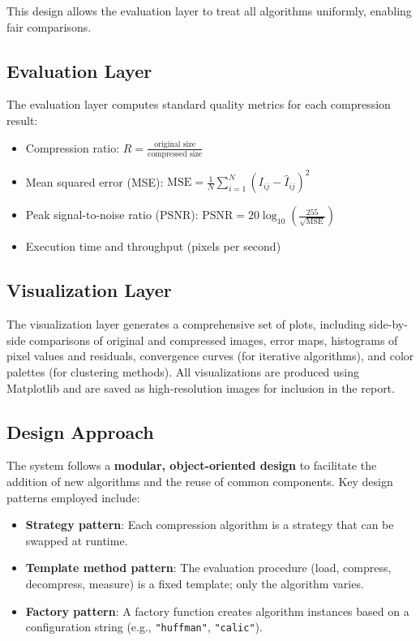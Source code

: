 This design allows the evaluation layer to treat all algorithms uniformly, enabling fair comparisons.

\subsection{Evaluation Layer}

The evaluation layer computes standard quality metrics for each compression result:

\begin{itemize}
    \item Compression ratio: \( \displaystyle R = \frac{\text{original size}}{\text{compressed size}} \)
    
    \item Mean squared error (MSE): \( \displaystyle \text{MSE} = \frac{1}{N}\sum_{i=1}^{N} (I_{ij} - \hat{I}_{ij})^2 \)
    
    \item Peak signal-to-noise ratio (PSNR): \( \displaystyle \text{PSNR} = 20\log_{10}\left(\frac{255}{\sqrt{\text{MSE}}}\right) \)
    
    \item Execution time and throughput (pixels per second)
\end{itemize}

\subsection{Visualization Layer}

The visualization layer generates a comprehensive set of plots, including side-by-side comparisons of original and compressed images, error maps, histograms of pixel values and residuals, convergence curves (for iterative algorithms), and color palettes (for clustering methods). All visualizations are produced using Matplotlib and are saved as high-resolution images for inclusion in the report.

\subsection{Design Approach}

The system follows a \textbf{modular, object-oriented design} to facilitate the addition of new algorithms and the reuse of common components. Key design patterns employed include:

\begin{itemize}
    \item \textbf{Strategy pattern}: Each compression algorithm is a strategy that can be swapped at runtime.
    \item \textbf{Template method pattern}: The evaluation procedure (load, compress, decompress, measure) is a fixed template; only the algorithm varies.
    \item \textbf{Factory pattern}: A factory function creates algorithm instances based on a configuration string (e.g., \texttt{"huffman"}, \texttt{"calic"}).
\end{itemize}

